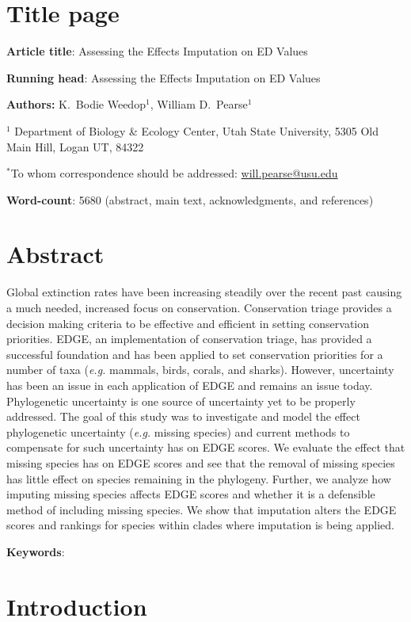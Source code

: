 \documentclass[12pt,english]{article}
\begin{document}
\setlength{\parindent}{0pt}
\section*{Title page}

\textbf{Article title}: Assessing the Effects Imputation on ED Values

\textbf{Running head}: Assessing the Effects Imputation on ED Values

\textbf{Authors:} K.\ Bodie Weedop$^{1}$, William D.\ Pearse$^{1}$\

$^1$ Department of Biology \& Ecology Center, Utah State University,
5305 Old Main Hill, Logan UT, 84322

$^*$To whom correspondence should be addressed:
\url{will.pearse@usu.edu}

\textbf{Word-count}: 5680 (abstract, main text, acknowledgments, and
  references)

\clearpage
\section*{Abstract}

Global extinction rates have been increasing steadily over the recent past
causing a much needed, increased focus on conservation. Conservation triage
provides a decision making criteria to be effective and efficient in setting
conservation priorities. EDGE, an implementation of conservation triage, has
provided a successful foundation and has been applied to set conservation
priorities for a number of taxa (\emph{e.g.} mammals, birds, corals, and
sharks). However, uncertainty has been an issue in each application of EDGE and
remains an issue today. Phylogenetic uncertainty is one source of uncertainty
yet to be properly addressed. The goal of this study was to investigate and
model the effect phylogenetic uncertainty (\emph{e.g.} missing species) and
current methods to compensate for such uncertainty has on EDGE scores. We
evaluate the effect that missing species has on EDGE scores and see that the
removal of missing species has little effect on species remaining in the
phylogeny. Further, we analyze how imputing missing species affects EDGE scores
and whether it is a defensible method of including missing species. We show that
imputation alters the EDGE scores and rankings for species within clades where
imputation is being applied.

\textbf{Keywords}: 

\clearpage
\section*{Introduction}
\end{document}
